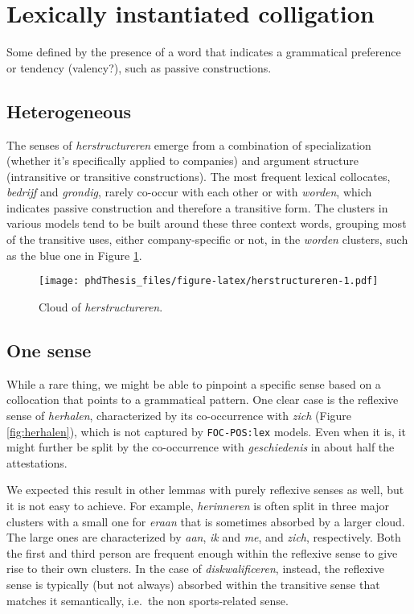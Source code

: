 \documentclass[
]{book}
\begin{document}
\hypertarget{colligation}{%
\section{Lexically instantiated colligation}\label{colligation}}

Some defined by the presence of a word that indicates a grammatical preference or tendency (valency?), such as passive constructions.

\hypertarget{heterogeneous}{%
\subsection{Heterogeneous}\label{heterogeneous}}

The senses of \emph{herstructureren} emerge from a combination of specialization (whether it's specifically applied to companies) and argument structure (intransitive or transitive constructions). The most frequent lexical collocates, \emph{bedrijf} and \emph{grondig}, rarely co-occur with each other or with \emph{worden}, which indicates passive construction and therefore a transitive form. The clusters in various models tend to be built around these three context words, grouping most of the transitive uses, either company-specific or not, in the \emph{worden} clusters, such as the blue one in Figure \ref{fig:herstructureren}.



\begin{figure}
\centering
\texttt{[image: phdThesis\_files/figure-latex/herstructureren-1.pdf]}
\caption{\label{fig:herstructureren}Cloud of \emph{herstructureren}.}
\end{figure}

\hypertarget{one-sense}{%
\subsection{One sense}\label{one-sense}}

While a rare thing, we might be able to pinpoint a specific sense based on a collocation that points to a grammatical pattern. One clear case is the reflexive sense of \emph{herhalen}, characterized by its co-occurrence with \emph{zich} (Figure \ref{fig:herhalen}), which is not captured by \texttt{FOC-POS:lex} models. Even when it is, it might further be split by the co-occurrence with \emph{geschiedenis} in about half the attestations.

We expected this result in other lemmas with purely reflexive senses as well, but it is not easy to achieve. For example, \emph{herinneren} is often split in three major clusters with a small one for \emph{eraan} that is sometimes absorbed by a larger cloud. The large ones are characterized by \emph{aan}, \emph{ik} and \emph{me}, and \emph{zich}, respectively. Both the first and third person are frequent enough within the reflexive sense to give rise to their own clusters. In the case of \emph{diskwalificeren}, instead, the reflexive sense is typically (but not always) absorbed within the transitive sense that matches it semantically, i.e.~the non sports-related sense.
\end{document}
